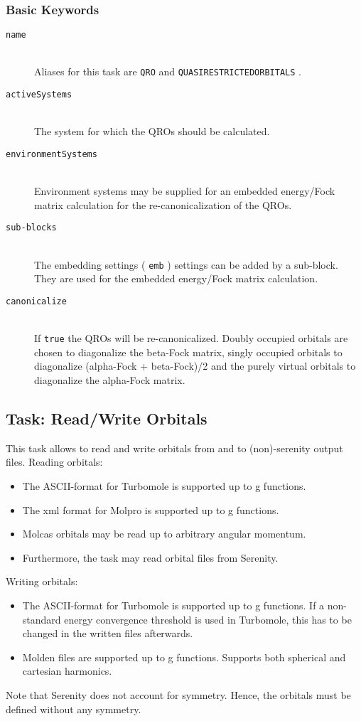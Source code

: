 \documentclass[bibliography=totocnumbered,a4paper,10pt,oneside]{scrbook}
\newcommand{\ttt}[1]{%
  \begingroup\setlength{\fboxsep}{1pt}%
  \colorbox{serenity-green!30}{\texttt{\hspace*{2pt}\vphantom{(g}#1\hspace*{2pt}}}%
  \endgroup
}
\begin{document}
\subsubsection{Basic Keywords}
\begin{description}
 \item [\texttt{name}]\hfill \\
  Aliases for this task are \ttt{QRO} and \ttt{QUASIRESTRICTEDORBITALS}.
 \item [\texttt{activeSystems}]\hfill \\
  The system for which the QROs should be calculated.
 \item [\texttt{environmentSystems}]\hfill \\
  Environment systems may be supplied for an embedded energy/Fock matrix calculation
  for the re-canonicalization of the QROs.
 \item[\texttt{sub-blocks}]\hfill \\
  The embedding settings (\ttt{emb}) settings can be added by a sub-block. They are used for the embedded energy/Fock matrix
  calculation.
 \item [\texttt{canonicalize}]\hfill \\
  If \ttt{true} the QROs will be re-canonicalized. Doubly occupied orbitals are chosen to
  diagonalize the beta-Fock matrix, singly occupied orbitals to diagonalize (alpha-Fock + beta-Fock)/2
  and the purely virtual orbitals to diagonalize the alpha-Fock matrix.
\end{description}

\subsection{Task: Read/Write Orbitals}

This task allows to read and write orbitals from and to (non)-serenity output files.\newline
Reading orbitals:
\begin{itemize}
  \item The ASCII-format for Turbomole is supported up to g functions.
  \item The xml format for Molpro is supported up to g functions.
  \item Molcas orbitals may be read up to arbitrary angular momentum.
  \item Furthermore, the task may read orbital files from Serenity.
\end{itemize}
Writing orbitals:
\begin{itemize}
  \item The ASCII-format for Turbomole is supported up to g functions. If a non-standard energy convergence threshold is used in Turbomole, this has to be changed in the written files afterwards.
  \item Molden files are supported up to g functions. Supports both spherical and cartesian harmonics.
\end{itemize}
Note that Serenity does not account for symmetry. Hence, the orbitals must be defined without any symmetry.
\end{document}
